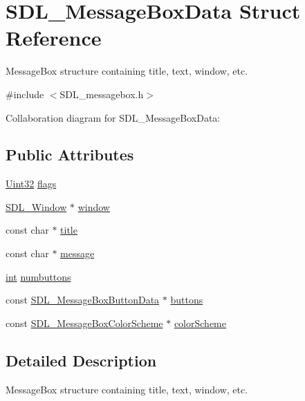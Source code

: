 \hypertarget{struct_s_d_l___message_box_data}{\section{S\-D\-L\-\_\-\-Message\-Box\-Data Struct Reference}
\label{struct_s_d_l___message_box_data}
}


Message\-Box structure containing title, text, window, etc.  




{\ttfamily \#include $<$S\-D\-L\-\_\-messagebox.\-h$>$}



Collaboration diagram for S\-D\-L\-\_\-\-Message\-Box\-Data\-:
\subsection*{Public Attributes}
\begin{DoxyCompactItemize}
\item 
\hyperlink{_s_d_l__stdinc_8h_add440eff171ea5f55cb00c4a9ab8672d}{Uint32} \hyperlink{struct_s_d_l___message_box_data_a113d016f760bf4e4156b0f376358d6a0}{flags}
\item 
\hyperlink{_s_d_l__video_8h_a55a196c7d3b8497538632c79ae1e6392}{S\-D\-L\-\_\-\-Window} $\ast$ \hyperlink{struct_s_d_l___message_box_data_a5c333bc93705c66068e140bc28daedcb}{window}
\item 
const char $\ast$ \hyperlink{struct_s_d_l___message_box_data_a93ceeafeed20b553ad4c86c9be37f117}{title}
\item 
const char $\ast$ \hyperlink{struct_s_d_l___message_box_data_ada6ae208a1f85adabbd7a7a08ca609c8}{message}
\item 
\hyperlink{_s_d_l__thread_8h_a6a64f9be4433e4de6e2f2f548cf3c08e}{int} \hyperlink{struct_s_d_l___message_box_data_a133f4fef549cc0cb14b799af35f3dc5a}{numbuttons}
\item 
const \hyperlink{struct_s_d_l___message_box_button_data}{S\-D\-L\-\_\-\-Message\-Box\-Button\-Data} $\ast$ \hyperlink{struct_s_d_l___message_box_data_a265e47aab749e384661ae91d3e11e0db}{buttons}
\item 
const \hyperlink{struct_s_d_l___message_box_color_scheme}{S\-D\-L\-\_\-\-Message\-Box\-Color\-Scheme} $\ast$ \hyperlink{struct_s_d_l___message_box_data_a18744865a3e89e260db5f01aee579e35}{color\-Scheme}
\end{DoxyCompactItemize}


\subsection{Detailed Description}
Message\-Box structure containing title, text, window, etc. 

